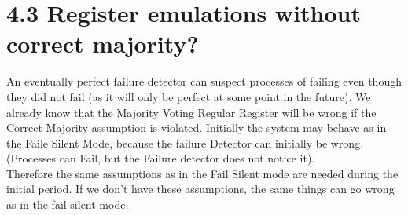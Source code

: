 \documentclass{article}
\begin{document}
	\section*{4.3 Register emulations without correct majority?}
	\begin{adjustwidth}{2em}{2em}
		An eventually perfect failure detector can suspect processes of failing even though they did not fail (as it will only be perfect at some point in the future). We already know that the Majority Voting Regular Register will be wrong if the Correct Majority assumption is violated. Initially the system may behave as in the Faile Silent Mode, because the failure Detector can initially be wrong. (Processes can Fail, but the Failure detector does not notice it). \\
		Therefore the same assumptions as in the Fail Silent mode are needed during the initial period. If we don't have these assumptions, the same things can go wrong as in the fail-silent mode.
	\end{adjustwidth}
\end{document}
